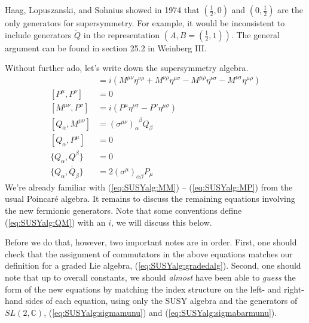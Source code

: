 \documentclass[12pt, oneside]{report}    %
\begin{document}
Haag, Lopuszanski, and Sohnius\autocite{Haag:1974qh} showed in 1974 that $(\frac 12,0)$ and $(0,\frac 12)$ are the only generators for supersymmetry. For example, it would be inconsistent to include generators $\tilde Q$ in the representation $(A,B = (\frac 12, 1))$. The general argument can be found in section 25.2 in Weinberg III. 

Without further ado, let's write down the supersymmetry algebra. 
\begin{align}
    [M^{\mu\nu},M^{\rho\sigma}] &= i(M^{\mu\nu}\eta^{\nu\rho}+M^{\nu\rho}\eta^{\mu\sigma}-M^{\mu\rho}\eta^{\nu\sigma}-M^{\nu\sigma}\eta^{\mu\rho})\label{eq:SUSYalg:MM}\\
    [P^\mu,P^\nu] &= 0\label{eq:SUSYalg:PP}\\
    [M^{\mu\nu},P^\sigma]&=i(P^\mu\eta^{\nu\sigma}-P^\nu\eta^{\mu\sigma}\label{eq:SUSYalg:MP})\\
    [Q_\alpha,M^{\mu\nu}] &= (\sigma^{\mu\nu})_\alpha^{\phantom\alpha\beta}Q_\beta\label{eq:SUSYalg:QM}\\
    [Q_\alpha,P^\mu]&=0\label{eq:SUSYalg:QP}\\
    \{Q_\alpha,Q^\beta\} &= 0\label{eq:SUSYalg:QQ}\\
    \{Q_\alpha,\overline Q_{\dot\beta}\} &= 2(\sigma^\mu)_{\alpha\dot\beta}P_\mu\label{eq:SUSYalg:QQbar}
\end{align}
We're already familiar with (\ref{eq:SUSYalg:MM}) -- (\ref{eq:SUSYalg:MP}) from the usual Poincar\'e algebra. It remains to discuss the remaining equations involving the new fermionic generators. Note that some conventions define  (\ref{eq:SUSYalg:QM}) with an $i$, we will discuss this below.

Before we do that, however, two important notes are in order. First, one should check that the assignment of commutators in the above equations matches our definition for a graded Lie algebra,  (\ref{eq:SUSYalg:gradedalg}). Second, one should note that up to overall constants, we should \textit{almost} have been able to \textit{guess} the form of the new equations by matching the index structure on the left- and right-hand sides of each equation, using only the SUSY algebra and the generators of $SL(2,\mathbb{C})$, (\ref{eq:SUSYalg:sigmamunu}) and (\ref{eq:SUSYalg:sigmabarmunu}).

\end{document}
